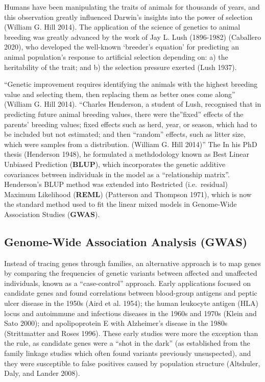 \documentclass[
]{book}
\begin{document}
Humans have been manipulating the traits of animals for thousands of years, and this observation greatly influenced Darwin's insights into the power of selection (William G. Hill 2014). The application of the science of genetics to animal breeding was greatly advanced by the work of Jay L. Lush (1896-1982) (Caballero 2020), who developed the well-known `breeder's equation' for predicting an animal population's response to artificial selection depending on: a) the heritability of the trait; and b) the selection pressure exerted (Lush 1937).

``Genetic improvement requires identifying the animals with the highest breeding value and selecting them, then replacing them as better ones come along'' (William G. Hill 2014). ``Charles Henderson, a student of Lush, recognised that in predicting future animal breeding values, there were the''fixed'' effects of the parents' breeding values; fixed effects such as herd, year, or season, which had to be included but not estimated; and then ``random'' effects, such as litter size, which were samples from a distribution. (William G. Hill 2014)'' The In his PhD thesis (Henderson 1948), he formulated a methdodology known as Best Linear Unbiased Prediction (\textbf{BLUP}), which incorporates the genetic additive covariances between individuals in the model as a ``relationship matrix''. Henderson's BLUP method was extended into Restricted (i.e.~residual) Maximum Likelihood (\textbf{REML}) (Patterson and Thompson 1971), which is now the standard method used to fit the linear mixed models in Genome-Wide Association Studies (\textbf{GWAS}).

\hypertarget{GWAS}{%
\subsection{Genome-Wide Association Analysis (GWAS)}\label{GWAS}}

Instead of tracing genes through families, an alternative approach is to map genes by comparing the frequencies of genetic variants between affected and unaffected individuals, known as a ``case-control'' approach. Early applications focused on candidate genes and found correlations between blood-group antigens and peptic ulcer disease in the 1950s (Aird et al. 1954); the human leukocyte antigen (HLA) locus and autoimmune and infectious diseases in the 1960s and 1970s (Klein and Sato 2000); and apolipoprotein E with Alzheimer's disease in the 1980s (Strittmatter and Roses 1996). These early studies were more the exception than the rule, as candidate genes were a ``shot in the dark'' (as established from the family linkage studies which often found variants previously unsuspected), and they were susceptible to false positives caused by population structure (Altshuler, Daly, and Lander 2008).
\end{document}
